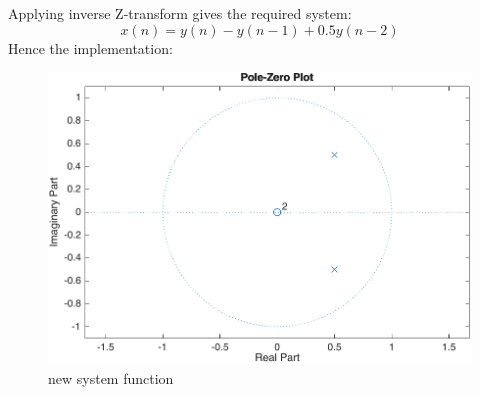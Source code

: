 Applying inverse Z-transform gives the required system:
$$x(n) = y(n) - y(n - 1) + 0.5y(n - 2)$$
Hence the implementation: 
\begin{figure}[ht!]
	\centering
	\includegraphics[width=.5\textwidth]{img/Q23.pdf}
	\caption*{new system function}
\end{figure}